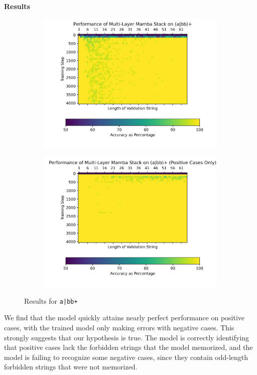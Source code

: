 \textbf{Results} 
\begin{figure}
    \begin{subfigure}{0.5\textwidth}
        \includegraphics[width=\textwidth]{figures/a_or_bb_plus_mixed.png}
        \caption{}
    \end{subfigure}
    \begin{subfigure}{0.5\textwidth}
        \includegraphics[width=\textwidth]{figures/a_or_bb_plus_positive_only.png}
        \caption{}
    \end{subfigure}
    \caption{Results for \texttt{a|bb+}}
\end{figure}
We find that the model quickly attains nearly perfect performance on positive
cases, with the trained model only making errors with negative cases.
This strongly suggests that our hypothesis is true.
The model is correctly identifying that positive cases lack the forbidden
strings that the model memorized, and the model is failing to recognize some
negative cases, since they contain odd-length forbidden strings that were not
memorized.

